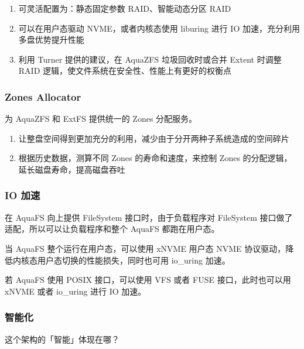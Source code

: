 \begin{enumerate}
    \item 可灵活配置为：静态固定参数 RAID、智能动态分区 RAID
    \item 可以在用户态驱动 NVME，或者内核态使用 liburing 进行 IO 加速，充分利用多盘优势提升性能
    \item 利用 Turner 提供的建议，在 AquaZFS 垃圾回收时或合并 Extent 时调整 RAID 逻辑，使文件系统在安全性、性能上有更好的权衡点
\end{enumerate}

\subsubsection*{Zones Allocator}

为 AquaZFS 和 ExtFS 提供统一的 Zones 分配服务。

\begin{enumerate}
    \item 让整盘空间得到更加充分的利用，减少由于分开两种子系统造成的空间碎片
    \item 根据历史数据，测算不同 Zones 的寿命和速度，来控制 Zones 的分配逻辑，延长磁盘寿命，提高磁盘吞吐
\end{enumerate}

\subsubsection*{IO 加速}

在 AquaFS 向上提供 FileSystem 接口时，由于负载程序对 FileSystem 接口做了适配，所以可以让负载程序和整个 AquaFS 都跑在用户态。

当 AquaFS 整个运行在用户态，可以使用 xNVME 用户态 NVME 协议驱动，降低内核态用户态切换的性能损失，同时也可用 io\_uring 加速。

若 AquaFS 使用 POSIX 接口，可以使用 VFS 或者 FUSE 接口，此时也可以用 xNVME 或者 io\_uring 进行 IO 加速。

\subsubsection*{智能化}

这个架构的「智能」体现在哪？

